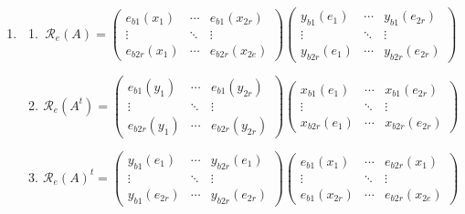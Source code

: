 \documentclass[aps,preprint]{revtex4}
\begin{document}
\begin{enumerate}
\item 
\begin{enumerate}
\item 
\begin{equation}
\mathcal{R}_{e}\left( A\right) =\left( 
\begin{array}{ccc}
e_{b1}\left( x_{1}\right) & \cdots & e_{b1}\left( x_{2r}\right) \\ 
\vdots & \ddots & \vdots \\ 
e_{b2r}\left( x_{1}\right) & \cdots & e_{b2r}\left( x_{2e}\right)%
\end{array}%
\right) \left( 
\begin{array}{ccc}
y_{b1}\left( e_{1}\right) & \cdots & y_{b1}\left( e_{2r}\right) \\ 
\vdots & \ddots & \vdots \\ 
y_{b2r}\left( e_{1}\right) & \cdots & y_{b2r}\left( e_{2r}\right)%
\end{array}%
\right)
\end{equation}

\item 
\begin{equation}
\mathcal{R}_{e}\left( A^{t}\right) =\left( 
\begin{array}{ccc}
e_{b1}\left( y_{1}\right) & \cdots & e_{b1}\left( y_{2r}\right) \\ 
\vdots & \ddots & \vdots \\ 
e_{b2r}\left( y_{1}\right) & \cdots & e_{b2r}\left( y_{2r}\right)%
\end{array}%
\right) \left( 
\begin{array}{ccc}
x_{b1}\left( e_{1}\right) & \cdots & x_{b1}\left( e_{2r}\right) \\ 
\vdots & \ddots & \vdots \\ 
x_{b2r}\left( e_{1}\right) & \cdots & x_{b2r}\left( e_{2r}\right)%
\end{array}%
\right)
\end{equation}

\item 
\begin{equation}
\mathcal{R}_{e}\left( A\right) ^{t}=\left( 
\begin{array}{ccc}
y_{b1}\left( e_{1}\right) & \cdots & y_{b2r}\left( e_{1}\right) \\ 
\vdots & \ddots & \vdots \\ 
y_{b1}\left( e_{2r}\right) & \cdots & y_{b2r}\left( e_{2r}\right)%
\end{array}%
\right) \left( 
\begin{array}{ccc}
e_{b1}\left( x_{1}\right) & \cdots & e_{b2r}\left( x_{1}\right) \\ 
\vdots & \ddots & \vdots \\ 
e_{b1}\left( x_{2r}\right) & \cdots & e_{b2r}\left( x_{2e}\right)%
\end{array}%
\right)
\end{equation}
\end{enumerate}


\end{enumerate}
\end{document}
